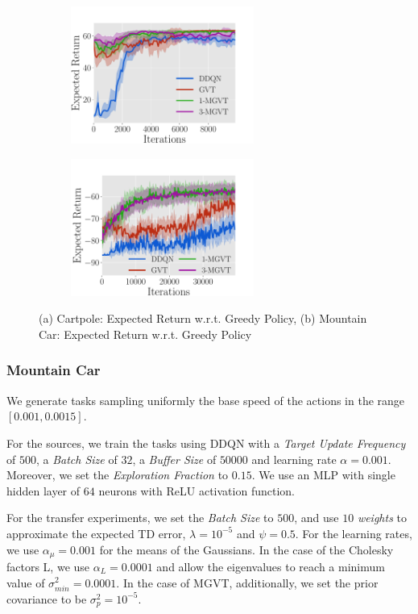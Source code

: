 \documentclass{article}
\begin{document}
\begin{figure}[t]
  \begin{subfigure}[b]{0.45\textwidth}
    \includegraphics[trim=0.0cm 0cm 1.8cm 1.3cm,clip=true,height=4.5cm]{images/cartpole/erew.pdf}
    \caption{}
    \label{fig:cp-erew}
  \end{subfigure}
  \begin{subfigure}[b]{0.45\textwidth}
    \includegraphics[trim=0.0cm 0cm 1.8cm 1.3cm,clip=true,height=4.5cm]{images/mountaincar/erew.pdf}
    \caption{}
    \label{fig:mc-erew}
  \end{subfigure}
  \caption{(a) Cartpole: Expected Return w.r.t. Greedy Policy, (b) Mountain Car: Expected Return w.r.t. Greedy Policy}
  \label{fig:ccerew}
\end{figure}

\subsubsection{Mountain Car}

We generate tasks sampling uniformly the base speed of the actions in the range $\left[0.001, 0.0015\right]$. 

For the sources, we train the tasks using DDQN with a \textit{Target Update Frequency} of $500$, a \textit{Batch Size} of $32$, a  \textit{Buffer Size} of $50000$ and learning rate $\alpha=0.001$. Moreover, we set the \textit{Exploration Fraction} to $0.15$. We use an MLP with single hidden layer of $64$ neurons with ReLU activation function. 

For the transfer experiments, we set the \textit{Batch Size} to $500$, and use $10$ \textit{weights} to approximate the expected TD error, $\lambda=10^{-5}$ and $\psi=0.5$. For the learning rates, we use $\alpha_{\mu}=0.001$ for the means of the Gaussians. In the case of the Cholesky factors L, we use $\alpha_L=0.0001$ and allow the eigenvalues to reach a minimum value of $\sigma_{min}^2=0.0001$. In the case of MGVT, additionally, we set the prior covariance to be $\sigma_p^2=10^{-5}$.
\end{document}
